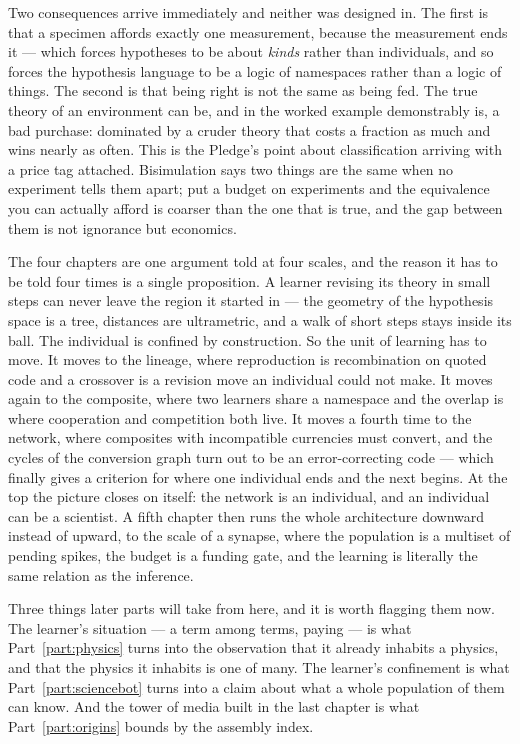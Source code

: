 \documentclass[12pt,openright,twoside]{book}
\theoremstyle{remark}
\theoremstyle{plain}
\theoremstyle{remark}
\theoremstyle{plain}
\theoremstyle{plain}
\begin{document}
Two consequences arrive immediately and neither was designed in.
The first is that a specimen affords exactly one measurement, because the
measurement ends it --- which forces hypotheses to be about \emph{kinds}
rather than individuals, and so forces the hypothesis language to be a
logic of namespaces rather than a logic of things.
The second is that being right is not the same as being fed.
The true theory of an environment can be, and in the worked example
demonstrably is, a bad purchase: dominated by a cruder theory that costs a
fraction as much and wins nearly as often.
This is the Pledge's point about classification arriving with a price tag
attached.
Bisimulation says two things are the same when no experiment tells them
apart; put a budget on experiments and the equivalence you can actually
afford is coarser than the one that is true, and the gap between them is
not ignorance but economics.

The four chapters are one argument told at four scales, and the reason it
has to be told four times is a single proposition.
A learner revising its theory in small steps can never leave the region it
started in --- the geometry of the hypothesis space is a tree, distances are
ultrametric, and a walk of short steps stays inside its ball.
The individual is confined by construction.
So the unit of learning has to move.
It moves to the lineage, where reproduction is recombination on quoted code
and a crossover is a revision move an individual could not make.
It moves again to the composite, where two learners share a namespace and
the overlap is where cooperation and competition both live.
It moves a fourth time to the network, where composites with incompatible
currencies must convert, and the cycles of the conversion graph turn out to
be an error-correcting code --- which finally gives a criterion for where one
individual ends and the next begins.
At the top the picture closes on itself: the network is an individual, and
an individual can be a scientist.
A fifth chapter then runs the whole architecture downward instead of
upward, to the scale of a synapse, where the population is a multiset of
pending spikes, the budget is a funding gate, and the learning is
literally the same relation as the inference.

Three things later parts will take from here, and it is worth flagging
them now.
The learner's situation --- a term among terms, paying --- is what
Part~\ref{part:physics} turns into the observation that it already
inhabits a physics, and that the physics it inhabits is one of many.
The learner's confinement is what Part~\ref{part:sciencebot} turns into a
claim about what a whole population of them can know.
And the tower of media built in the last chapter is what
Part~\ref{part:origins} bounds by the assembly index.
\end{document}
